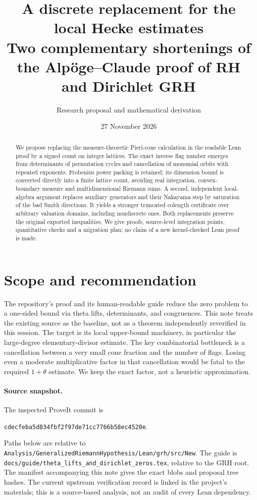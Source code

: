 \documentclass[11pt]{article}
\title{\vspace{-1.1em}\textbf{A discrete replacement for the local Hecke estimates}\\[0.3em]\large Two complementary shortenings of the Alp\"oge--Claude proof of RH and Dirichlet GRH}
\author{Research proposal and mathematical derivation}
\date{27 November 2026}
\theoremstyle{remark}\newtheorem{remark}[theorem]{Remark}
\newcommand{\code}[1]{\texttt{#1}}
\begin{document}
\maketitle
\begin{abstract}
We propose replacing the measure-theoretic Pieri-cone calculation in the readable Lean proof by a signed count on integer lattices. The exact inverse flag number emerges from determinants of permutation cycles and cancellation of monomial orbits with repeated exponents. Frobenius power packing is retained; its dimension bound is converted directly into a finite lattice count, avoiding real integration, convex-boundary measure and multidimensional Riemann sums. A second, independent local-algebra argument replaces auxiliary generators and their Nakayama step by saturation of the bad Smith directions. It yields a stronger truncated colength certificate over arbitrary valuation domains, including nondiscrete ones. Both replacements preserve the original exported inequalities. We give proofs, source-level integration points, quantitative checks and a migration plan; no claim of a new kernel-checked Lean proof is made.
\end{abstract}
\tableofcontents

\section{Scope and recommendation}
The repository's proof and its human-readable guide reduce the zero problem to a one-sided bound via theta lifts, determinants, and congruences. This note treats the existing source as the baseline, not as a theorem independently reverified in this session. The target is its local upper-bound machinery, in particular the large-degree elementary-divisor estimate. The key combinatorial bottleneck is a cancellation between a very small cone fraction and the number of flags. Losing even a moderate multiplicative factor in that cancellation would be fatal to the required $1+\theta$ estimate. We keep the exact factor, not a heuristic approximation.

\paragraph{Source snapshot.} The inspected ProveIt commit is
\begin{center}\small\code{cdecfeba5d834fbf2f97de71cc7766b58ec4520e}.\end{center}
Paths below are relative to \code{Analysis/GeneralizedRiemannHypothesis/Lean/grh/src/New}. The guide is \code{docs/guide/theta\_lifts\_and\_dirichlet\_zeros.tex}, relative to the GRH root. The manifest accompanying this note gives the exact blobs and proposal tree hashes. The current upstream verification record is linked in the project's materials; this is a source-based analysis, not an audit of every Lean dependency.
\end{document}
